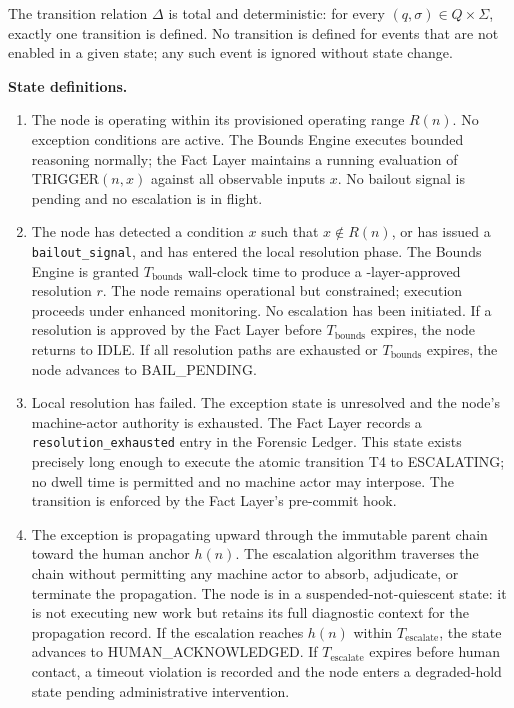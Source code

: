 The transition relation $\Delta$ is total and deterministic: for every $(q, \sigma) \in Q \times \Sigma$, exactly one transition is defined. No transition is defined for events that are not enabled in a given state; any such event is ignored without state change.

\bigskip
\noindent\textbf{State definitions.}

\begin{enumerate}\itemsep=0pt
\item[\textbf{IDLE.}] The node is operating within its provisioned operating range $R(n)$. No exception conditions are active. The Bounds Engine executes bounded reasoning normally; the Fact Layer maintains a running evaluation of $\text{TRIGGER}(n, x)$ against all observable inputs $x$. No bailout signal is pending and no escalation is in flight.

\item[\textbf{BOUNDED.}] The node has detected a condition $x$ such that $x \notin R(n)$, or has issued a \texttt{bailout\_signal}, and has entered the local resolution phase. The Bounds Engine is granted $T_{\text{bounds}}$ wall-clock time to produce a \fact-layer-approved resolution $r$. The node remains operational but constrained; execution proceeds under enhanced monitoring. No escalation has been initiated. If a resolution is approved by the Fact Layer before $T_{\text{bounds}}$ expires, the node returns to IDLE. If all resolution paths are exhausted or $T_{\text{bounds}}$ expires, the node advances to BAIL\_PENDING.

\item[\textbf{BAIL\_PENDING.}] Local resolution has failed. The exception state is unresolved and the node's machine-actor authority is exhausted. The Fact Layer records a \texttt{resolution\_exhausted} entry in the Forensic Ledger. This state exists precisely long enough to execute the atomic transition T4 to ESCALATING; no dwell time is permitted and no machine actor may interpose. The transition is enforced by the Fact Layer's pre-commit hook.

\item[\textbf{ESCALATING.}] The exception is propagating upward through the immutable parent chain toward the human anchor $h(n)$. The escalation algorithm traverses the chain without permitting any machine actor to absorb, adjudicate, or terminate the propagation. The node is in a suspended-not-quiescent state: it is not executing new work but retains its full diagnostic context for the propagation record. If the escalation reaches $h(n)$ within $T_{\text{escalate}}$, the state advances to HUMAN\_ACKNOWLEDGED. If $T_{\text{escalate}}$ expires before human contact, a timeout violation is recorded and the node enters a degraded-hold state pending administrative intervention.


\end{enumerate}
